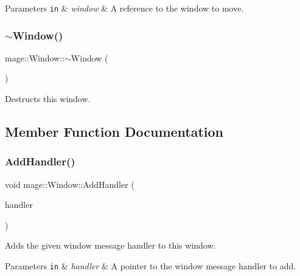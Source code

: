 \begin{DoxyParams}[1]{Parameters}
\mbox{\tt in}  & {\em window} & A reference to the window to move. \\
\hline
\end{DoxyParams}
\mbox{\label{classmage_1_1_window_a71d3ce0b3141e89121ae09e8fc64a217}} 
\subsubsection{\texorpdfstring{$\sim$\+Window()}{~Window()}}
{\footnotesize\ttfamily mage\+::\+Window\+::$\sim$\+Window (\begin{DoxyParamCaption}{ }\end{DoxyParamCaption})\hspace{0.3cm}{\ttfamily [default]}}

Destructs this window. 

\subsection{Member Function Documentation}
\mbox{\label{classmage_1_1_window_ae33b5ea74354830278c9ee130fa917c7}} 
\subsubsection{\texorpdfstring{Add\+Handler()}{AddHandler()}}
{\footnotesize\ttfamily void mage\+::\+Window\+::\+Add\+Handler (\begin{DoxyParamCaption}\item[{\mbox{\hyperlink{classmage_1_1_window_add1d792fb9f71e70d4fb07409d80cfdd}{Window\+Message\+Handler\+Ptr}}}]{handler }\end{DoxyParamCaption})}

Adds the given window message handler to this window.


\begin{DoxyParams}[1]{Parameters}
\mbox{\tt in}  & {\em handler} & A pointer to the window message handler to add. \\
\hline
\end{DoxyParams}
\mbox{\label{classmage_1_1_window_ac6020962e1fd29118675207bde5d216d}} 
